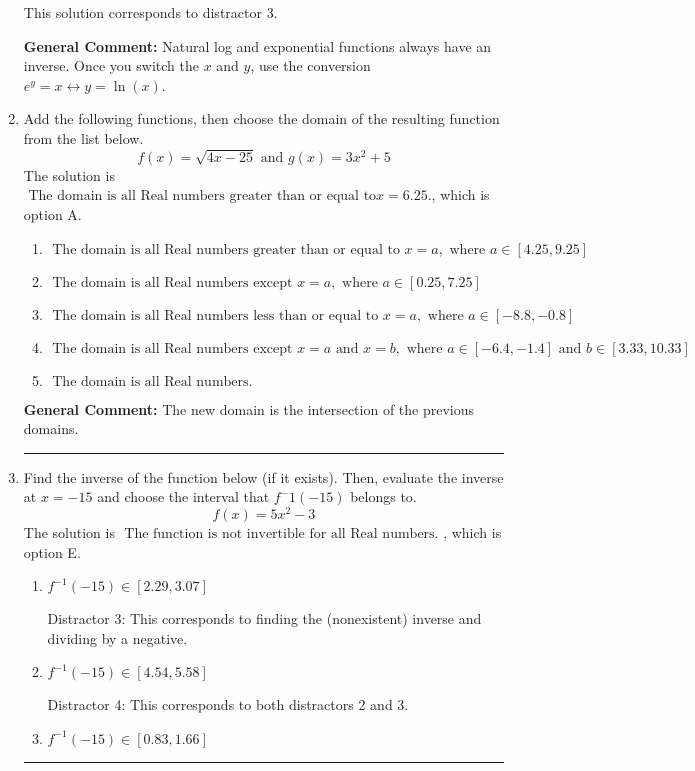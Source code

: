 \documentclass{extbook}[14pt]
\newcommand{\litem}[1]{\item #1

\rule{\textwidth}{0.4pt}}
\begin{document}
\begin{enumerate}
{\begin{enumerate}[label=\Alph*.]
 This solution corresponds to distractor 3.
\end{enumerate}

\textbf{General Comment:} Natural log and exponential functions always have an inverse. Once you switch the $x$ and $y$, use the conversion $ e^y = x \leftrightarrow y=\ln(x)$.
}
\litem{
Add the following functions, then choose the domain of the resulting function from the list below.
\[ f(x) = \sqrt{4x-25}  \text{ and } g(x) = 3x^{2} + 5 \]The solution is \( \text{ The domain is all Real numbers greater than or equal to} x = 6.25. \), which is option A.\begin{enumerate}[label=\Alph*.]
\item \( \text{ The domain is all Real numbers greater than or equal to } x = a, \text{ where } a \in [4.25, 9.25] \)


\item \( \text{ The domain is all Real numbers except } x = a, \text{ where } a \in [0.25, 7.25] \)


\item \( \text{ The domain is all Real numbers less than or equal to } x = a, \text{ where } a \in [-8.8, -0.8] \)


\item \( \text{ The domain is all Real numbers except } x = a \text{ and } x = b, \text{ where } a \in [-6.4, -1.4] \text{ and } b \in [3.33, 10.33] \)


\item \( \text{ The domain is all Real numbers. } \)


\end{enumerate}

\textbf{General Comment:} The new domain is the intersection of the previous domains.
}
\litem{
Find the inverse of the function below (if it exists). Then, evaluate the inverse at $x = -15$ and choose the interval that $f^-1(-15)$ belongs to.
\[ f(x) = 5 x^2 - 3 \]The solution is \( \text{ The function is not invertible for all Real numbers. } \), which is option E.\begin{enumerate}[label=\Alph*.]
\item \( f^{-1}(-15) \in [2.29, 3.07] \)

 Distractor 3: This corresponds to finding the (nonexistent) inverse and dividing by a negative.
\item \( f^{-1}(-15) \in [4.54, 5.58] \)

 Distractor 4: This corresponds to both distractors 2 and 3.
\item \( f^{-1}(-15) \in [0.83, 1.66] \)


\end{enumerate}}
\end{enumerate}
\end{document}
